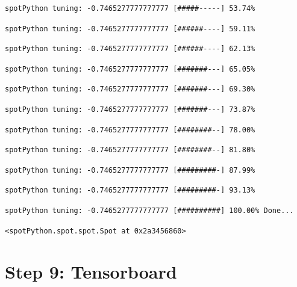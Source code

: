 \documentclass[
  letterpaper,
  DIV=11,
  numbers=noendperiod]{scrreprt}
\begin{document}
\begin{verbatim}
spotPython tuning: -0.7465277777777777 [#####-----] 53.74% 
\end{verbatim}

\begin{verbatim}
spotPython tuning: -0.7465277777777777 [######----] 59.11% 
\end{verbatim}

\begin{verbatim}
spotPython tuning: -0.7465277777777777 [######----] 62.13% 
\end{verbatim}

\begin{verbatim}
spotPython tuning: -0.7465277777777777 [#######---] 65.05% 
\end{verbatim}

\begin{verbatim}
spotPython tuning: -0.7465277777777777 [#######---] 69.30% 
\end{verbatim}

\begin{verbatim}
spotPython tuning: -0.7465277777777777 [#######---] 73.87% 
\end{verbatim}

\begin{verbatim}
spotPython tuning: -0.7465277777777777 [########--] 78.00% 
\end{verbatim}

\begin{verbatim}
spotPython tuning: -0.7465277777777777 [########--] 81.80% 
\end{verbatim}

\begin{verbatim}
spotPython tuning: -0.7465277777777777 [#########-] 87.99% 
\end{verbatim}

\begin{verbatim}
spotPython tuning: -0.7465277777777777 [#########-] 93.13% 
\end{verbatim}

\begin{verbatim}
spotPython tuning: -0.7465277777777777 [##########] 100.00% Done...
\end{verbatim}

\begin{verbatim}
<spotPython.spot.spot.Spot at 0x2a3456860>
\end{verbatim}

\hypertarget{sec-tensorboard-19}{%
\section{Step 9: Tensorboard}\label{sec-tensorboard-19}}
\end{document}
